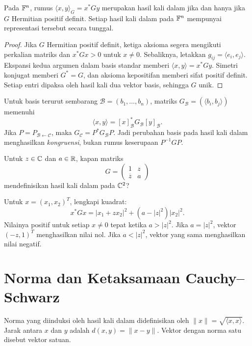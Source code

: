 \begin{teorema}
    Pada $\mathbb{F}^n$, rumus $\langle x,y\rangle_G=x^*Gy$ merupakan
    hasil kali dalam jika dan hanya jika $G$ Hermitian positif definit.
    Setiap hasil kali dalam pada $\mathbb{F}^n$ mempunyai representasi
    tersebut secara tunggal.
\end{teorema}
\begin{proof}
    Jika $G$ Hermitian positif definit, ketiga aksioma segera
    mengikuti perkalian matriks dan $x^*Gx>0$ untuk $x\ne0$.
    Sebaliknya, letakkan $g_{ij}=\langle e_i,e_j\rangle$.
    Ekspansi kedua argumen dalam basis standar memberi
    $\langle x,y\rangle=x^*Gy$.
    Simetri konjugat memberi $G^*=G$, dan aksioma kepositifan
    memberi sifat positif definit. Setiap entri dipaksa oleh
    hasil kali dua vektor basis, sehingga $G$ unik.
\end{proof}

Untuk basis terurut sembarang $\mathcal B=(b_1,\ldots,b_n)$,
matriks $G_{\mathcal B}=(\langle b_i,b_j\rangle)$ memenuhi
\[
    \langle x,y\rangle=[x]_{\mathcal B}^*G_{\mathcal B}[y]_{\mathcal B}.
\]
Jika $P=P_{\mathcal B\leftarrow\mathcal C}$, maka
$G_{\mathcal C}=P^*G_{\mathcal B}P$.
Jadi perubahan basis pada hasil kali dalam menghasilkan
\emph{kongruensi}, bukan rumus keserupaan $P^{-1}GP$.

\begin{exam}
    Untuk $z\in\mathbb{C}$ dan $a\in\mathbb{R}$, kapan matriks
    \[
        G=\begin{pmatrix}1&z\\\overline z&a\end{pmatrix}
    \]
    mendefinisikan hasil kali dalam pada $\mathbb{C}^2$?
\end{exam}
\begin{solution}
    Untuk $x=(x_1,x_2)^T$, lengkapi kuadrat:
    \[
        x^*Gx=|x_1+zx_2|^2+(a-|z|^2)|x_2|^2.
    \]
    Nilainya positif untuk setiap $x\ne0$ tepat ketika $a>|z|^2$.
    Jika $a=|z|^2$, vektor $(-z,1)^T$ menghasilkan nilai nol.
    Jika $a<|z|^2$, vektor yang sama menghasilkan nilai negatif.
\end{solution}

\section{Norma dan Ketaksamaan Cauchy--Schwarz}

\begin{definisi}
    Norma yang diinduksi oleh hasil kali dalam didefinisikan oleh
    $\|x\|=\sqrt{\langle x,x\rangle}$.
    Jarak antara $x$ dan $y$ adalah $d(x,y)=\|x-y\|$.
    Vektor dengan norma satu disebut vektor satuan.
\end{definisi}

